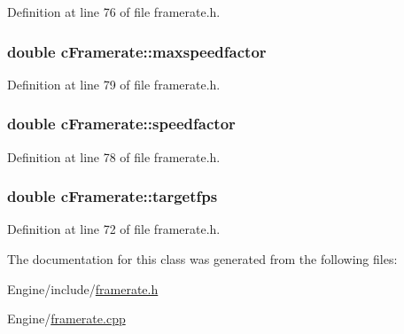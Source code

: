 Definition at line 76 of file framerate.\-h.

\hypertarget{classc_framerate_ad1bca95d162390adcab7352edf2b839c}{
\subsubsection[{maxspeedfactor}]{\setlength{\rightskip}{0pt plus 5cm}double c\-Framerate\-::maxspeedfactor}}\label{classc_framerate_ad1bca95d162390adcab7352edf2b839c}


Definition at line 79 of file framerate.\-h.

\hypertarget{classc_framerate_a5852e9eaeadefcd0da9d0e5c9ec63980}{
\subsubsection[{speedfactor}]{\setlength{\rightskip}{0pt plus 5cm}double c\-Framerate\-::speedfactor}}\label{classc_framerate_a5852e9eaeadefcd0da9d0e5c9ec63980}


Definition at line 78 of file framerate.\-h.

\hypertarget{classc_framerate_af5658ae10ecbaecab7b26251bfc5603b}{
\subsubsection[{targetfps}]{\setlength{\rightskip}{0pt plus 5cm}double c\-Framerate\-::targetfps}}\label{classc_framerate_af5658ae10ecbaecab7b26251bfc5603b}


Definition at line 72 of file framerate.\-h.



The documentation for this class was generated from the following files\-:\begin{DoxyCompactItemize}
\item 
Engine/include/\hyperlink{framerate_8h}{framerate.\-h}\item 
Engine/\hyperlink{framerate_8cpp}{framerate.\-cpp}\end{DoxyCompactItemize}
